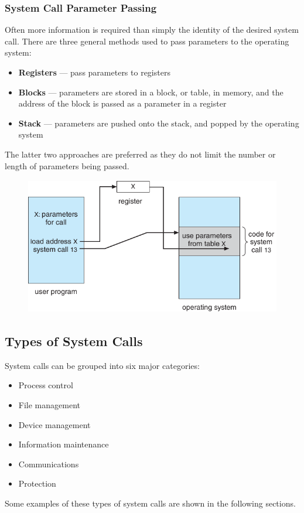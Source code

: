 \documentclass{article}
\begin{document}
\subsubsection{System Call Parameter Passing}
Often more information is required than simply the identity of the desired system call.
There are three general methods used to pass parameters to the operating system:
\begin{itemize}
    \item \textbf{Registers} --- pass parameters to registers
    \item \textbf{Blocks} --- parameters are stored in a block, or table, in memory, and the address of the block is passed as a parameter in a register
    \item \textbf{Stack} --- parameters are pushed onto the stack, and popped by the operating system
\end{itemize}
The latter two approaches are preferred as they do not limit the number or length of parameters being passed.
\begin{figure}[H]
    \centering
    \includegraphics[height = 6cm]{figures/system_call_param_pass.pdf}
\end{figure}
\subsection{Types of System Calls}
System calls can be grouped into six major categories:
\begin{itemize}
    \item Process control
    \item File management
    \item Device management
    \item Information maintenance
    \item Communications
    \item Protection
\end{itemize}
Some examples of these types of system calls are shown in the following sections.
\end{document}
